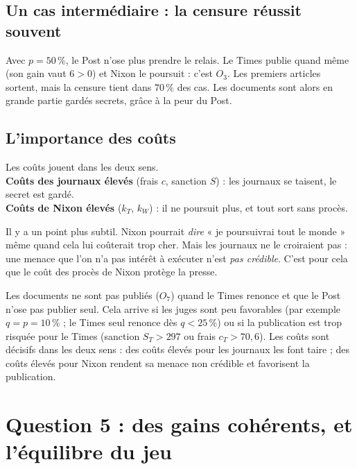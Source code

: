 \documentclass[11pt,a4paper]{article}
\theoremstyle{definition}
\begin{document}
\subsection{Un cas intermédiaire : la censure réussit souvent}
Avec $p=50\,\%$, le Post n'ose plus prendre le relais. Le Times publie quand même (son gain vaut $6>0$) et Nixon le poursuit : c'est $O_3$. Les premiers articles sortent, mais la censure tient dans $70\,\%$ des cas. Les documents sont alors en grande partie gardés secrets, grâce à la peur du Post.

\subsection{L'importance des coûts}
\begin{simple}
Les coûts jouent dans les deux sens.\\
\textbf{Coûts des journaux élevés} (frais $c$, sanction $S$) : les journaux se taisent, le secret est gardé.\\
\textbf{Coûts de Nixon élevés} ($k_T$, $k_W$) : il ne poursuit plus, et tout sort sans procès.
\end{simple}
Il y a un point plus subtil. Nixon pourrait \emph{dire} « je poursuivrai tout le monde » même quand cela lui coûterait trop cher. Mais les journaux ne le croiraient pas : une menace que l'on n'a pas intérêt à exécuter n'est \emph{pas crédible}. C'est pour cela que le coût des procès de Nixon protège la presse.

\begin{reponse}
Les documents ne sont pas publiés ($O_7$) quand le Times renonce et que le Post n'ose pas publier seul. Cela arrive si les juges sont peu favorables (par exemple $q=p=10\,\%$ ; le Times seul renonce dès $q<25\,\%$) ou si la publication est trop risquée pour le Times (sanction $S_T>297$ ou frais $c_T>70,6$). Les coûts sont décisifs dans les deux sens : des coûts élevés pour les journaux les font taire ; des coûts élevés pour Nixon rendent sa menace non crédible et favorisent la publication.
\end{reponse}

\section{Question 5 : des gains cohérents, et l'équilibre du jeu}
\end{document}
